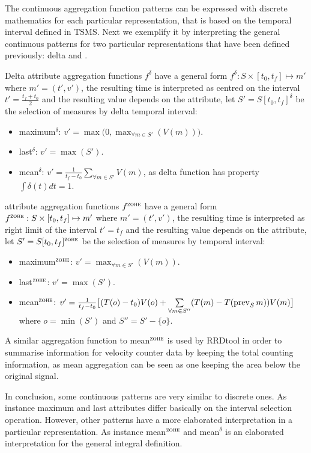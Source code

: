 The continuous aggregation function patterns can be expressed with
discrete mathematics for each particular representation, that is based
on the temporal interval defined in TSMS. Next we exemplify it by
interpreting the general continuous patterns for two particular
representations that have been defined previously: delta and \zohe{}.


Delta attribute aggregation functions $f^\delta$ have a general form
$f^\delta : S \times [t_0,t_f]\mapsto m'$ where $m'=(t',v')$, the
resulting time is interpreted as centred on the interval
$t'=\frac{t_f+t_0}{2}$ and the resulting value depends on the
attribute, let $S'=S[t_0,t_f]^\delta$ be the selection of measures by
delta temporal interval:
\begin{itemize}
\item maximum$^\delta$: $v' = \max\big(0,\max_{\forall m \in S'}(V(m))\big)$. 
\item last$^\delta$: $v' = \max(S')$.
\item mean$^\delta$: $v' = \frac{1}{t_f-t_0} \sum\limits_{\forall m
    \in S'} V(m)$, as delta function has property $\int\delta(t)dt=1$.
\end{itemize}


\zohe{} attribute aggregation functions $f^\zohe{}$ have a general
form $f^\zohe{} : S \times [t_0,t_f]\mapsto m'$ where $m'=(t',v')$,
the resulting time is interpreted as right limit of the interval
$t'=t_f$ and the resulting value depends on the attribute, let
$S'=S[t_0,t_f]^\zohe{}$ be the selection of measures by \zohe{} temporal
interval:
\begin{itemize}
\item maximum$^\zohe{}$: $v' = \max_{\forall m \in S'}(V(m))$. 
\item last$^\zohe{}$: $v' = \max(S')$.
\item mean$^\zohe{}$: $v' = \frac{1}{t_f-t_0} \big[ (T(o)-t_0)V(o) +
  \sum\limits_{\forall m \in S''}( T(m)- T(\operatorname*{prev}_S
  m) )V(m) \big]$ where $o=\min(S')$ and $S''= S' - \{o\}$.
\end{itemize}

A similar aggregation function to mean$^\zohe{}$ is used by RRDtool
\cite{rrdtool} in order to summarise information for velocity counter
data by keeping the total counting information, as mean aggregation
can be seen as one keeping the area below the original signal.


In conclusion, some continuous patterns are very similar to discrete
ones. As instance maximum and last attributes differ basically on the
interval selection operation. However, other patterns have a more
elaborated interpretation in a particular representation. As instance
mean$^\zohe{}$ and mean$^\delta$ is an elaborated interpretation for
the general integral definition.





